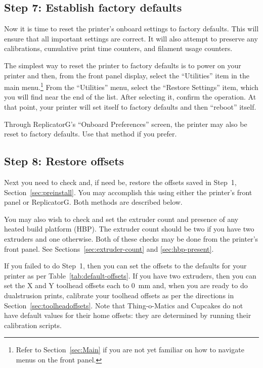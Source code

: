 
\subsection{Step 7: Establish factory defaults}

Now it is time to reset the printer's onboard settings to factory defaults.
This will ensure that all important settings are correct.  It will
also attempt to preserve any calibrations, cumulative print time
counters, and filament usage counters.

The simplest way to reset the printer to factory defaults is to
power on your printer and then, from the front panel display, select
the ``Utilities'' item in the main menu.\footnote{Refer to
Section~\ref{sec:Main} if you are not yet
familiar on how to navigate menus on the front panel.}  From the
``Utilities'' menu, select the ``Restore Settings'' item, which you will
find near the end of the list.  After selecting it, confirm the operation.
At that point, your printer will set itself to factory defaults and
then ``reboot'' itself.

Through ReplicatorG's ``Onboard Preferences'' screen, the printer may
also be reset to factory defaults.  Use that method if you prefer.


\subsection{Step 8: Restore offsets} \label{sec:checkoffsets}

Next you need to check and, if need be, restore the offsets saved in
Step~1, Section~\ref{sec:preinstall}.  You may accomplish this
using either the printer's front panel or ReplicatorG.  Both methods
are described below.

You may also wish to check and set the extruder count and presence of
any heated build platform (\gls{HBP}).  The extruder count should be two if
you have two extruders and one otherwise.  Both of these checks may be
done from the printer's front panel.  See Sections~\ref{sec:extruder-count}
and \ref{sec:hbp-present}.

If you failed to do Step~1, then you can set the offsets to the
defaults for your printer as per Table~\ref{tab:default-offsets}.  If
you have two extruders, then you can set the X and Y toolhead offsets
each to 0~mm and, when you are ready to do \gls{dualstrusion} prints,
calibrate your toolhead offsets as per the directions in
Section~\ref{sec:toolheadoffsets}.
Note that Thing-o-Matics and Cupcakes do not have default values for their
home offsets: they are determined by running their calibration scripts.

